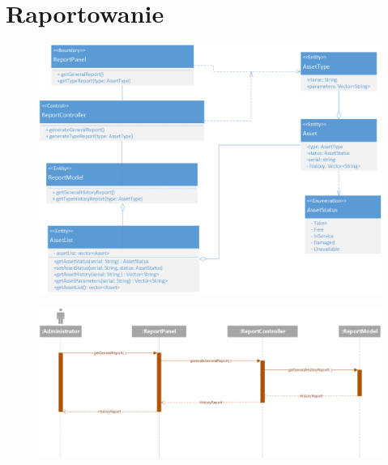 \documentclass[11pt, a4paper, oneside]{report}
\begin{document}
\section{Raportowanie}
\begin{figure}[H]
\centering
\includegraphics[scale=0.5]{raportowanie_class.png}
\end{figure}
\begin{figure}[H]
\centering
\includegraphics[scale=0.5]{raportowanie_sequence.png}
\end{figure}
\end{document}
